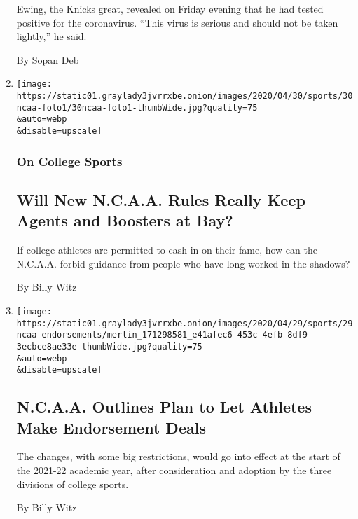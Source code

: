 \begin{enumerate}
  Ewing, the Knicks great, revealed on Friday evening that he had tested
  positive for the coronavirus. ``This virus is serious and should not
  be taken lightly,'' he said.

  By Sopan Deb
\item
  \href{/2020/05/01/sports/ncaa-paying-athletes-boosters.html}{}

  \texttt{[image: https://static01.graylady3jvrrxbe.onion/images/2020/04/30/sports/30ncaa-folo1/30ncaa-folo1-thumbWide.jpg?quality=75\\\&auto=webp\\\&disable=upscale]}

  \hypertarget{on-college-sports}{%
  \subsubsection{On College Sports}\label{on-college-sports}}

  \hypertarget{will-new-ncaa-rules-really-keep-agents-and-boosters-at-bay}{%
  \subsection{Will New N.C.A.A. Rules Really Keep Agents and Boosters at
  Bay?}\label{will-new-ncaa-rules-really-keep-agents-and-boosters-at-bay}}

  If college athletes are permitted to cash in on their fame, how can
  the N.C.A.A. forbid guidance from people who have long worked in the
  shadows?

  By Billy Witz
\item
  \href{/2020/04/29/sports/ncaabasketball/ncaa-athlete-endorsements.html}{}

  \texttt{[image: https://static01.graylady3jvrrxbe.onion/images/2020/04/29/sports/29ncaa-endorsements/merlin\_171298581\_e41afec6-453c-4efb-8df9-3ecbce8ae33e-thumbWide.jpg?quality=75\\\&auto=webp\\\&disable=upscale]}

  \hypertarget{ncaa-outlines-plan-to-let-athletes-make-endorsement-deals}{%
  \subsection{N.C.A.A. Outlines Plan to Let Athletes Make Endorsement
  Deals}\label{ncaa-outlines-plan-to-let-athletes-make-endorsement-deals}}

  The changes, with some big restrictions, would go into effect at the
  start of the 2021-22 academic year, after consideration and adoption
  by the three divisions of college sports.

  By Billy Witz
\end{enumerate}

